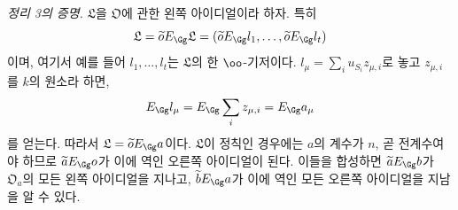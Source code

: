 
\medskip
\noindent\emph{정리 3의 증명.} $\mathfrak L$을 $\mathfrak O$에 관한 왼쪽 아이디얼이라 하자. 특히
\[
\mathfrak L=\widetilde oE_\Gg\mathfrak L
 =(\widetilde oE_\Gg l_1,\ldots,\widetilde oE_\Gg l_t)
\]
이며, 여기서 예를 들어 $l_1,\ldots,l_t$는 $\mathfrak L$의 한 $\oo$-기저이다. $l_\mu=\sum_i u_{S_i}z_{\mu,i}$로 놓고 $z_{\mu,i}$를 $k$의 원소라 하면,
\[
E_\Gg l_\mu=E_\Gg\sum_i z_{\mu,i}=E_\Gg a_\mu
\]
를 얻는다. 따라서 $\mathfrak L=\widetilde oE_\Gg a$이다. $\mathfrak L$이 정칙인 경우에는 $a$의 계수가 $n$, 곧 전계수여야 하므로 $\widetilde aE_\Gg o$가 이에 역인 오른쪽 아이디얼이 된다. 이들을 합성하면 $\widetilde aE_\Gg b$가 $\mathfrak O_a$의 모든 왼쪽 아이디얼을 지나고, $\widetilde bE_\Gg a$가 이에 역인 모든 오른쪽 아이디얼을 지남을 알 수 있다.
